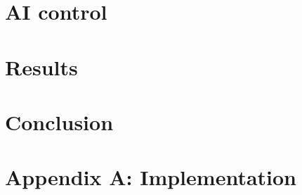 \documentclass{article}
\newcommand{\inhoud}[1]{\textcolor{blue}{\textbf{\newline Summary: }\it{#1}}}
\begin{document}


\section{AI control} 
\label{sec:AI}

\section{Results}
\label{sec:results}

\section{Conclusion}
\label{sec:conclusion}

\newpage
\section*{Appendix A: Implementation}
\label{sec:implementation}


\newpage 
\end{document}
